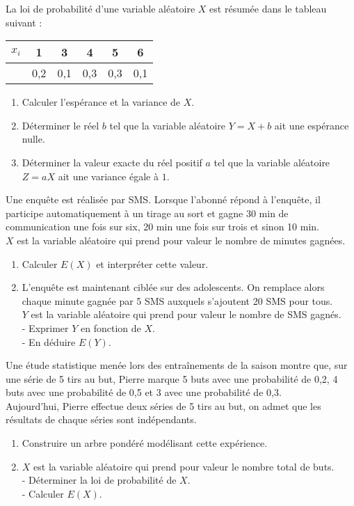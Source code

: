 \documentclass[a4paper,11pt,exos]{nsi} %
\begin{document}
\exo{}
La loi de probabilité d'une variable aléatoire $X$ est résumée dans le tableau suivant :
\begin{center}
	\begin{tabular}{|c|c|c|c|c|c|}
		\hline
		\cellcolor{UGLiOrange}\textbf{{$x_i$}} & 1 & 3 & 4 & 5 & 6\\
		\hline
		\cellcolor{UGLiOrange}{\boldmath $P(X=x_i)$} & 0,2 & 0,1 & 0,3 & 0,3 & 0,1\\
		\hline
	\end{tabular}
\end{center}
\begin{enumerate}
	\item 	Calculer l'espérance et la variance de $X$.
	\item 	Déterminer le réel $b$ tel que la variable aléatoire $Y=X+b$ ait une espérance nulle.
	\item 	Déterminer la valeur exacte du réel positif $a$ tel que la variable aléatoire $Z=aX$ ait une variance égale à $1$.\\
\end{enumerate}

\exo{}
Une enquête est réalisée par SMS. Lorsque l'abonné répond à l'enquête, il participe automatiquement à un tirage au sort et gagne $30$ min de 
communication une fois sur six, 20 min une fois sur trois et sinon 10 min.\\
$X$ est la variable aléatoire qui prend pour valeur le nombre de minutes gagnées.
\begin{enumerate}
	\item 	Calculer $E(X)$ et interpréter cette valeur.
	\item 	L'enquête est maintenant ciblée sur des adolescents. On remplace alors chaque minute gagnée par 5 SMS auxquels s'ajoutent 20 SMS pour 
	tous.\\
	$Y$ est la variable aléatoire qui prend pour valeur le nombre de SMS gagnés.\\
	- Exprimer $Y$ en fonction de $X$.\\
	- En déduire $E(Y)$.\\
\end{enumerate}


\exo{}
Une étude statistique menée lors des entraînements de la saison montre que, sur une série de 5 tirs au but, Pierre marque 5 buts avec une 
probabilité de 0,2, 4 buts avec une probabilité de 0,5 et 3 avec une probabilité de 0,3.\\
Aujourd'hui, Pierre effectue deux séries de 5 tirs au but, on admet que les résultats de chaque séries sont indépendants.
\begin{enumerate}
	\item 	Construire un arbre pondéré modélisant cette expérience.
	\item 	$X$ est la variable aléatoire qui prend pour valeur le nombre total de buts.\\
	- Déterminer la loi de probabilité de $X$.\\
	- Calculer $E(X)$.\\
\end{enumerate}
\end{document}
